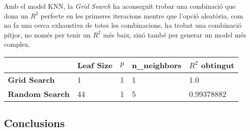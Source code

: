 \documentclass[a4paper, 11pt]{article}
\begin{document}
        Amb el model KNN, la \textit{Grid Search} ha aconseguit trobar una combinació que dona un $R^2$ perfecte en les primeres iteracions mentre que l'opció aleatòria, com no fa una cerca exhaustiva de totes les combinacions, ha trobat una combinació pitjor, no només per tenir un $R^2$ més baix, sinó també per generar un model més complex.
        \begin{table}[H]
            \centering
            \begin{tabular}{|l|l|l|l|l|}
            \hline
            \textbf{}              & \textbf{Leaf Size} & \textbf{$p$} & \textbf{n\_neighbors} & \textbf{$R^2$ obtingut} \\ \hline
            \textbf{Grid Search}   & 1                  & 1            & 1                     & 1.0                       \\ \hline
            \textbf{Random Search} & 44                 & 1            & 5                     & 0.99378882              \\ \hline
            \end{tabular}
        \end{table}

        \subsection{Conclusions}
\end{document}
